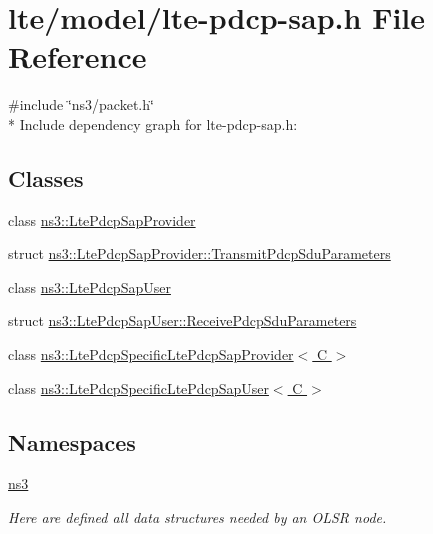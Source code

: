 \hypertarget{lte-pdcp-sap_8h}{}\section{lte/model/lte-\/pdcp-\/sap.h File Reference}
\label{lte-pdcp-sap_8h}
{\ttfamily \#include \char`\"{}ns3/packet.\+h\char`\"{}}\\*
Include dependency graph for lte-\/pdcp-\/sap.h\+:
\subsection*{Classes}
\begin{DoxyCompactItemize}
\item 
class \hyperlink{classns3_1_1LtePdcpSapProvider}{ns3\+::\+Lte\+Pdcp\+Sap\+Provider}
\item 
struct \hyperlink{structns3_1_1LtePdcpSapProvider_1_1TransmitPdcpSduParameters}{ns3\+::\+Lte\+Pdcp\+Sap\+Provider\+::\+Transmit\+Pdcp\+Sdu\+Parameters}
\item 
class \hyperlink{classns3_1_1LtePdcpSapUser}{ns3\+::\+Lte\+Pdcp\+Sap\+User}
\item 
struct \hyperlink{structns3_1_1LtePdcpSapUser_1_1ReceivePdcpSduParameters}{ns3\+::\+Lte\+Pdcp\+Sap\+User\+::\+Receive\+Pdcp\+Sdu\+Parameters}
\item 
class \hyperlink{classns3_1_1LtePdcpSpecificLtePdcpSapProvider}{ns3\+::\+Lte\+Pdcp\+Specific\+Lte\+Pdcp\+Sap\+Provider$<$ C $>$}
\item 
class \hyperlink{classns3_1_1LtePdcpSpecificLtePdcpSapUser}{ns3\+::\+Lte\+Pdcp\+Specific\+Lte\+Pdcp\+Sap\+User$<$ C $>$}
\end{DoxyCompactItemize}
\subsection*{Namespaces}
\begin{DoxyCompactItemize}
\item 
 \hyperlink{namespacens3}{ns3}
\begin{DoxyCompactList}\small\item\em Here are defined all data structures needed by an O\+L\+SR node. \end{DoxyCompactList}\end{DoxyCompactItemize}
